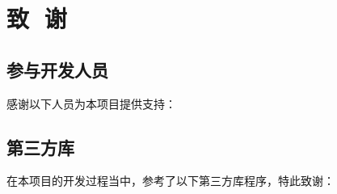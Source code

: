\chapter{致\,\,\,\,谢}

\section{参与开发人员}

感谢以下人员为本项目提供支持：


\section{第三方库}

在本项目的开发过程当中，参考了以下第三方库程序，特此致谢：